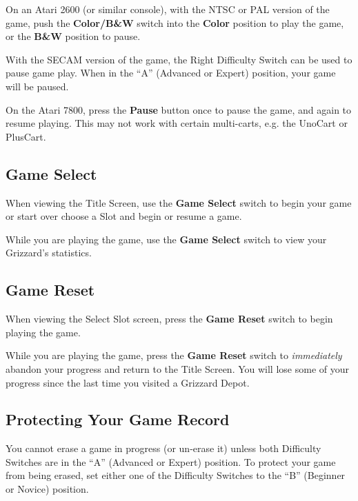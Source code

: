 \documentclass[9pt,twocolumn,openany,article,crop]{memoir}
\begin{document}
On an Atari 2600  (or similar console), with the NTSC  or PAL version of
the game,  push the  \textbf{Color/B\&W} switch into  the \textbf{Color}
position  to play  the game,  or  the \textbf{B\&W}  position to  pause.

With the SECAM  version of the game, the Right  Difficulty Switch can be
used  to  pause game  play.  When  in  the  ``A'' (Advanced  or  Expert)
position, your  game will be paused.

On the  Atari 7800, press  the \textbf{Pause}  button once to  pause the
game, and again to resume playing. \ifdefined\ATARIAGESAVE\else This may
not work with certain multi-carts, e.g. the UnoCart or PlusCart. \fi

\subsection{Game Select}

When viewing  the Title Screen,  use the \textbf{Game Select}  switch to
\ifdefined\NOSAVE begin your game or start  over \else choose a Slot and
begin or resume a game. \fi

While you  are playing the  game, use the  \textbf{Game Select}
switch to view your Grizzard's  statistics.

\subsection{Game Reset}

When  viewing the  Select  Slot screen,  press  the \textbf{Game  Reset}
switch to begin playing the game.

While you are playing the game,  press the \textbf{Game Reset} switch to
\emph{immediately} abandon your progress and return to the Title Screen.
You will  lose some  of your  progress since the  last time  you visited
a Grizzard Depot.

\ifdefined\NOSAVE\else

\subsection{Protecting Your Game Record}

You  cannot erase  a  game  in progress  (or  un-erase  it) unless  both
Difficulty  Switches are  in the  ``A'' (Advanced  or Expert)  position.
To protect your game from being erased, set either one of the Difficulty
Switches to the ``B'' (Beginner or Novice) position.
\end{document}
